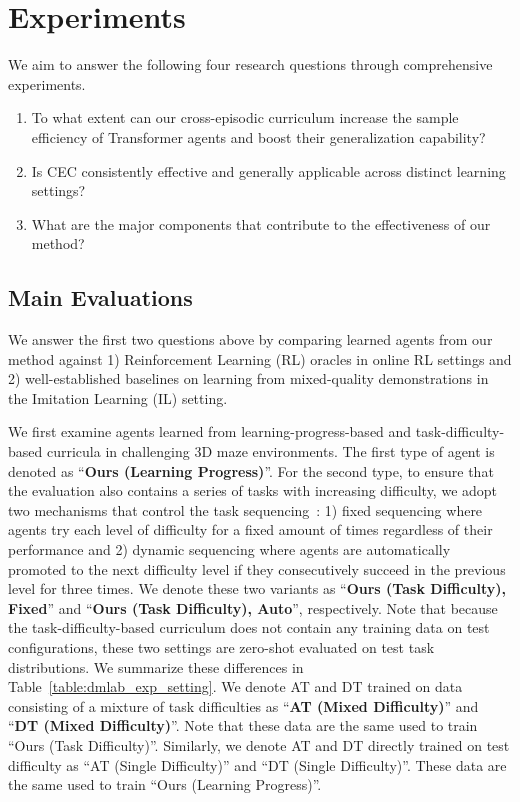 \section{Experiments}
\label{sec:experiments}


We aim to answer the following four research questions through comprehensive experiments.

\begin{enumerate}
    \item{To what extent can our cross-episodic curriculum increase the sample efficiency of Transformer agents and boost their generalization capability?}

    \item{Is CEC consistently effective and generally applicable across distinct learning settings?}

    \item{What are the major components that contribute to the effectiveness of our method?}

\end{enumerate}


\vspace{-0.5em}

\subsection{Main Evaluations}
We answer the first two questions above by comparing learned agents from our method against 1) Reinforcement Learning (RL) oracles in online RL settings and 2) well-established baselines on learning from mixed-quality demonstrations in the Imitation Learning (IL) setting.

We first examine agents learned from learning-progress-based and task-difficulty-based curricula in challenging 3D maze environments.
The first type of agent is denoted as ``\textbf{Ours (Learning Progress)}''.
For the second type, to ensure that the evaluation also contains a series of tasks with increasing difficulty, we adopt two mechanisms that control the task sequencing~\citep{Narvekar2017AutonomousTS}: 1) fixed sequencing where agents try each level of difficulty for a fixed amount of times regardless of their performance and 2) dynamic sequencing where agents are automatically promoted to the next difficulty level if they consecutively succeed in the previous level for three times.
We denote these two variants as ``\textbf{Ours (Task Difficulty), Fixed}'' and ``\textbf{Ours (Task Difficulty), Auto}'', respectively.
Note that because the task-difficulty-based curriculum does not contain any training data on test configurations, these two settings are zero-shot evaluated on test task distributions. We summarize these differences in Table~\ref{table:dmlab_exp_setting}. 
We denote AT and DT trained on data consisting of a mixture of task difficulties as ``\textbf{AT (Mixed Difficulty)}'' and ``\textbf{DT (Mixed Difficulty)}''.
Note that these data are the same used to train ``Ours (Task Difficulty)''.
Similarly, we denote AT and DT directly trained on test difficulty as ``AT (Single Difficulty)'' and ``DT (Single Difficulty)''.
These data are the same used to train ``Ours (Learning Progress)''.


